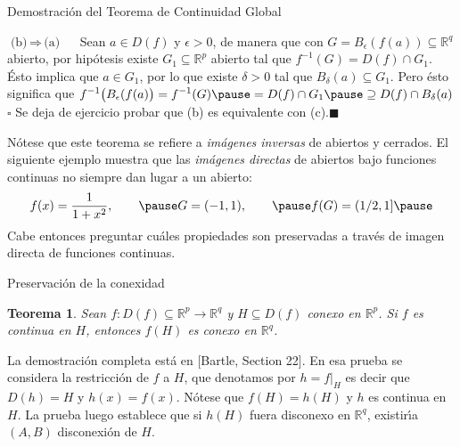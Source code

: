 \documentclass[xcolor=dvipsnames,10pt,handout, draft]{beamer}
\newcommand{\rzp}{\mathbb R^{p}}
\newcommand{\rzq}{\mathbb R^{q}}
\newtheorem*{teo}{Teorema}
\begin{document}
\begin{frame}{Demostraci\'on del Teorema de Continuidad Global}

{\color{green!59!black} $\text{(b)}\,\Rightarrow\,\text{(a)}\quad$} 
Sean $a\in D(f)$ y $\epsilon>0$, de manera que con $G=B_\epsilon(f(a))\subseteq\rzq$ abierto, por hip\'otesis existe $G_1\subseteq\rzp$ abierto tal que $\displaystyle f^{-1}(G)=D(f)\cap G_1$.
\vskip4pt\pause
\'Esto implica que $a\in G_1$, por lo que existe $\delta>0$ tal que $B_\delta(a)\subseteq G_1$.
\vskip4pt\pause
Pero \'esto significa que 
$\displaystyle f^{-1}\big(B_\epsilon(f(a)\big)=f^{-1}(G)\pause=D(f)\cap G_1\pause\supseteq D(f)\cap B_\delta(a)$\hfill$\square$
\vskip8pt\pause
Se deja de ejercicio probar que (b) es equivalente con (c).\hfill$\blacksquare$

\vskip6pt\pause
N\'otese que este teorema se refiere a {\em imágenes inversas} de abiertos y cerrados. \pause\vskip4pt El siguiente ejemplo muestra que las {\em im\'agenes directas} de abiertos bajo funciones continuas no siempre dan lugar a un abierto:\pause
$$f(x)=\frac{1}{1+x^2},\qquad\pause G=(-1,1),\qquad\pause f(G)=(1/2,1]\pause$$ 
Cabe entonces preguntar cuáles propiedades son preservadas a trav\'es de imagen directa de funciones continuas.

\end{frame}



\begin{frame}{Preservaci\'on de la conexidad}

\begin{teo}
Sean $f:D(f)\subseteq\rzp\to\rzq$ y $H\subseteq D(f)$ conexo en $\rzp$. Si $f$ es continua en $H$, entonces $f(H)$ es conexo en $\rzq$.
\end{teo}\pause

La demostraci\'on completa est\'a en [Bartle, Section 22]. \pause
En esa prueba se considera la restricci\'on de $f$ a $H$, que denotamos por $h=f\big|_H$ es decir que $D(h)=H$ y $h(x)=f(x)$.
\vskip4pt\pause
N\'otese que $f(H)=h(H)$ y $h$ es continua en $H$.
\vskip4pt\pause
La prueba luego establece que si $h(H)$ fuera disconexo en $\rzq$, existir\'\i a $(A,B)$ disconexi\'on de $H$. 

\end{frame}
\end{document}
